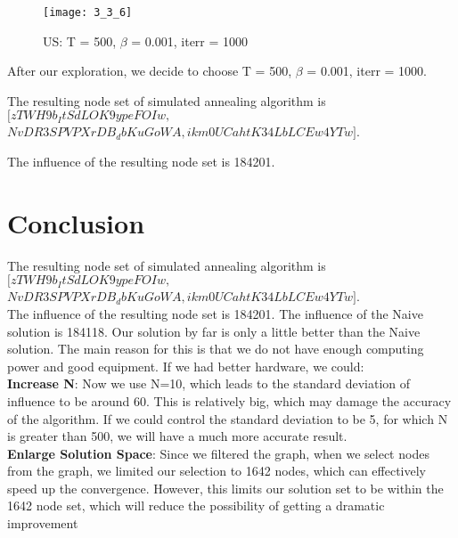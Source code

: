 \documentclass{article}
\begin{document}
\begin{figure}[h]
\begin{center}
\texttt{[image: 3\_3\_6]} %
\caption{US: T = 500, $\beta$ = 0.001, iterr = 1000}
\end{center}
\end{figure}

After our exploration, we decide to choose T = 500,   $\beta$ = 0.001, iterr = 1000.

The resulting node set of simulated annealing algorithm is $[zTWH9b_ItSdLOK9ypeFOIw, $\\
$NvDR3SPVPXrDB_dbKuGoWA, $$ikm0UCahtK34LbLCEw4YTw]$.

The influence of the resulting node set is 184201.  




\section{Conclusion}
The resulting node set of simulated annealing algorithm is $[zTWH9b_ItSdLOK9ypeFOIw, $\\
$NvDR3SPVPXrDB_dbKuGoWA, $$ikm0UCahtK34LbLCEw4YTw]$.\\

The influence of the resulting node set is 184201.  The influence of the Naive solution is 184118. Our solution by far is only a little better than the Naive solution. The main reason for this is that we do not have enough computing power and good equipment. If we had better hardware, we could:\\

\textbf{Increase N}: Now we use N=10, which leads to the standard deviation of influence to be around 60. This is relatively big, which may damage the accuracy of the algorithm. If we could control the standard deviation to be 5, for which N is greater than 500, we will have a much more accurate result. \\

\textbf{Enlarge Solution Space}: Since we filtered the graph, when we select nodes from the graph, we limited our selection to 1642 nodes, which can effectively speed up the convergence. However, this limits our solution set to be within the 1642 node set, which will reduce the possibility of getting a dramatic improvement\\
\end{document}
